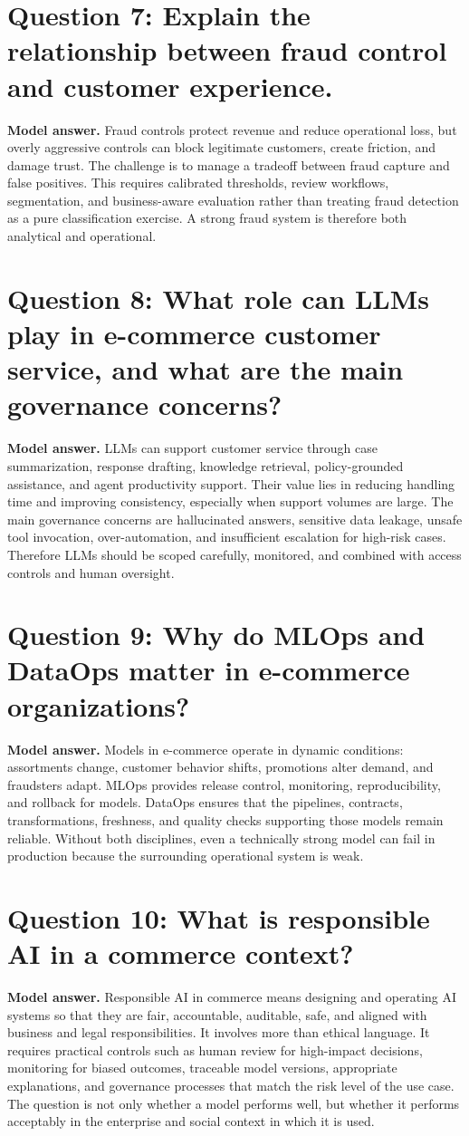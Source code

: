 \section*{Question 7: Explain the relationship between fraud control and customer experience.}
\textbf{Model answer.}
Fraud controls protect revenue and reduce operational loss, but overly aggressive controls can block legitimate customers, create friction, and damage trust.
The challenge is to manage a tradeoff between fraud capture and false positives.
This requires calibrated thresholds, review workflows, segmentation, and business-aware evaluation rather than treating fraud detection as a pure classification exercise.
A strong fraud system is therefore both analytical and operational.

\section*{Question 8: What role can LLMs play in e-commerce customer service, and what are the main governance concerns?}
\textbf{Model answer.}
LLMs can support customer service through case summarization, response drafting, knowledge retrieval, policy-grounded assistance, and agent productivity support.
Their value lies in reducing handling time and improving consistency, especially when support volumes are large.
The main governance concerns are hallucinated answers, sensitive data leakage, unsafe tool invocation, over-automation, and insufficient escalation for high-risk cases.
Therefore LLMs should be scoped carefully, monitored, and combined with access controls and human oversight.

\section*{Question 9: Why do MLOps and DataOps matter in e-commerce organizations?}
\textbf{Model answer.}
Models in e-commerce operate in dynamic conditions: assortments change, customer behavior shifts, promotions alter demand, and fraudsters adapt.
MLOps provides release control, monitoring, reproducibility, and rollback for models.
DataOps ensures that the pipelines, contracts, transformations, freshness, and quality checks supporting those models remain reliable.
Without both disciplines, even a technically strong model can fail in production because the surrounding operational system is weak.

\section*{Question 10: What is responsible AI in a commerce context?}
\textbf{Model answer.}
Responsible AI in commerce means designing and operating AI systems so that they are fair, accountable, auditable, safe, and aligned with business and legal responsibilities.
It involves more than ethical language.
It requires practical controls such as human review for high-impact decisions, monitoring for biased outcomes, traceable model versions, appropriate explanations, and governance processes that match the risk level of the use case.
The question is not only whether a model performs well, but whether it performs acceptably in the enterprise and social context in which it is used.


